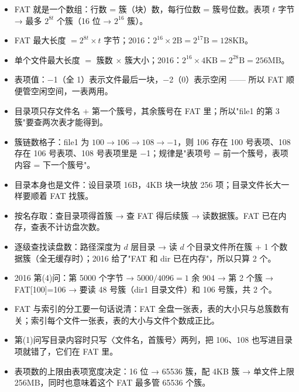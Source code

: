 \documentclass[10pt,a4paper]{ctexart}
\begin{document}
\begin{itemize}

\item FAT 就是一个数组：行数 = 簇（块）数，每行位数 = 簇号位数。表项 $t$ 字节 → 最多 $2^{8t}$ 个簇（16 位 → $2^{16}$ 簇）。

\item FAT 最大长度 $=2^{8t}\times t$ 字节；2016：$2^{16}\times2\text{B}=2^{17}\text{B}=128\text{KB}$。

\item 单个文件最大长度 $=$ 簇数 $\times$ 簇大小；2016：$2^{16}\times4\text{KB}=2^{28}\text{B}=256\text{MB}$。

\item 表项值：−1（全 1）表示文件最后一块，−2（0）表示空闲 —— 所以 FAT 顺便管空闲空间，一表两用。

\item 目录项只存文件名 + 第一个簇号，其余簇号在 FAT 里；所以"file1 的第 3 簇"要查两次表才能得到。

\item 簇链数格子：file1 为 $100\to106\to108\to-1$，则 106 存在 100 号表项、108 存在 106 号表项、108 号表项里是 −1；规律是"表项号 = 前一个簇号，表项内容 = 下一个簇号"。

\item 目录本身也是文件：设目录项 16B，4KB 块一块放 256 项；目录文件长大一样要顺着 FAT 找簇。

\item 按名存取：查目录项得首簇 → 查 FAT 得后续簇 → 读数据簇。FAT 已在内存，查表不计访盘次数。

\item 逐级查找读盘数：路径深度为 $d$ 层目录 → 读 $d$ 个目录文件所在簇 + 1 个数据簇（全无缓存时）；2016 给了"FAT 和 dir 已在内存"，所以只算 2 个。

\item 2016 第(4)问：第 5000 个字节 → $5000/4096=1$ 余 904 → 第 2 个簇 → FAT[100]=106 → 要读 48 号簇（dir1 目录文件）和 106 号簇，共 2 个。

\item FAT 与索引的分工要一句话说清：FAT 全盘一张表，表的大小只与总簇数有关；索引每个文件一张表，表的大小与文件个数成正比。

\item 第(1)问写目录内容时只写〈文件名，首簇号〉两列，把 106、108 也写进目录项就错了，它们在 FAT 里。

\item 表项数的上限由表项宽度决定：16 位 → 65536 簇，配 4KB 簇 → 单文件上限 256MB，同时也意味着这个 FAT 最多管 65536 个簇。

\end{itemize}
\end{document}
